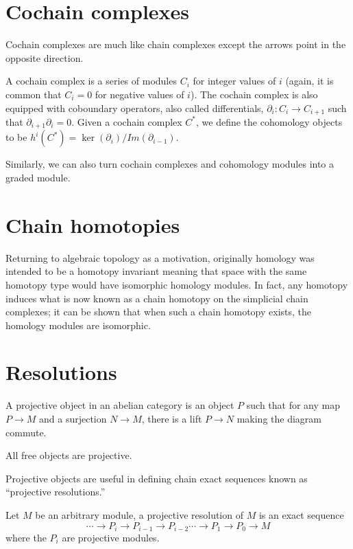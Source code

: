 \section{Cochain complexes}
Cochain complexes are much like chain complexes except the arrows point in the
opposite direction.
\begin{definition} A cochain complex is a series of modules $C_i$ for integer
values of $i$ (again, it is common that $C_i=0$ for negative values of $i$). The
cochain complex is also equipped with coboundary operators, also called
differentials, $\partial_i:C_i\rightarrow C_{i+1}$ such that
$\partial_{i+1}\partial_i=0$. Given a cochain complex $C^*$, we define the
cohomology objects to be $h^i(C^*)=\ker(\partial_i)/Im(\partial_{i-1})$.
\end{definition}
Similarly, we can also turn cochain complexes and cohomology modules into a
graded module.

\section{Chain homotopies}
Returning to algebraic topology as a motivation, originally homology was
intended to be a homotopy invariant meaning that space with the same homotopy
type would have isomorphic homology modules. In fact, any homotopy induces what
is now known as a chain homotopy on the simplicial chain complexes; it can be
shown that when such a chain homotopy exists, the homology modules are
isomorphic.

\section{Resolutions}

\begin{definition} A projective object in an abelian category is an object $P$
such that for any map $P\rightarrow M$ and a surjection $N\rightarrow M$, there
is a lift $P\rightarrow N$ making the diagram commute. \end{definition}
\begin{example} All free objects are projective. \end{example}
Projective objects are useful in defining chain exact sequences known as ``projective resolutions.''

\begin{definition} Let $M$ be an arbitrary module, a projective resolution of
$M$ is an exact sequence
\begin{equation} \cdots\rightarrow P_i\rightarrow P_{i-1}\rightarrow
P_{i-2}\cdots\rightarrow P_1\rightarrow P_0\rightarrow M \end{equation} where
the $P_i$ are projective modules. \end{definition}



